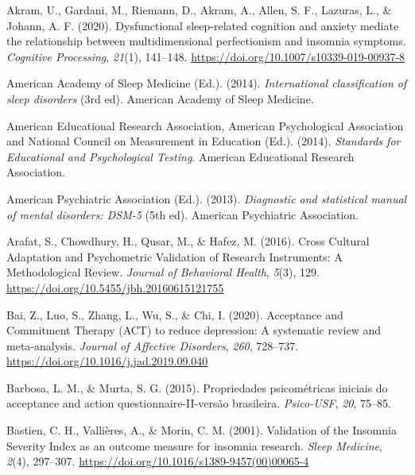 \documentclass[
  ,doc,11pt, twoside,floatsintext]{apa6}
\newlength{\cslhangindent}
\newlength{\cslentryspacingunit} %
\newenvironment{CSLReferences}[2] %
 {%
  \setlength{\parindent}{0pt}
  \ifodd #1
  \let\oldpar\par
  \def\par{\hangindent=\cslhangindent\oldpar}
  \fi
  \setlength{\parskip}{#2\cslentryspacingunit}
 }%
 {}
\begin{document}
\setlength{\parindent}{-0.5in}
\setlength{\leftskip}{0.5in}

\hypertarget{refs}{}
\begin{CSLReferences}{1}{0}
\leavevmode{}%
Akram, U., Gardani, M., Riemann, D., Akram, A., Allen, S. F., Lazuras, L., \& Johann, A. F. (2020). Dysfunctional sleep-related cognition and anxiety mediate the relationship between multidimensional perfectionism and insomnia symptoms. \emph{Cognitive Processing}, \emph{21}(1), 141--148. \url{https://doi.org/10.1007/s10339-019-00937-8}

\leavevmode{}%
American Academy of Sleep Medicine (Ed.). (2014). \emph{International classification of sleep disorders} (3rd ed). {American Academy of Sleep Medicine}.

\leavevmode{}%
American Educational Research Association, American Psychological Association and National Council on Measurement in Education (Ed.). (2014). \emph{Standards for {Educational} and {Psychological Testing}}. {American Educational Research Association}.

\leavevmode{}%
American Psychiatric Association (Ed.). (2013). \emph{Diagnostic and statistical manual of mental disorders: {DSM}-5} (5th ed). {American Psychiatric Association}.

\leavevmode{}%
Arafat, S., Chowdhury, H., Qusar, M., \& Hafez, M. (2016). Cross {Cultural Adaptation} and {Psychometric Validation} of {Research Instruments}: A {Methodological Review}. \emph{Journal of Behavioral Health}, \emph{5}(3), 129. \url{https://doi.org/10.5455/jbh.20160615121755}

\leavevmode{}%
Bai, Z., Luo, S., Zhang, L., Wu, S., \& Chi, I. (2020). Acceptance and {Commitment Therapy} ({ACT}) to reduce depression: {A} systematic review and meta-analysis. \emph{Journal of Affective Disorders}, \emph{260}, 728--737. \url{https://doi.org/10.1016/j.jad.2019.09.040}

\leavevmode{}%
Barbosa, L. M., \& Murta, S. G. (2015). Propriedades psicométricas iniciais do acceptance and action questionnaire-II-versão brasileira. \emph{Psico-USF}, \emph{20}, 75--85.

\leavevmode{}%
Bastien, C. H., Vallières, A., \& Morin, C. M. (2001). Validation of the {Insomnia Severity Index} as an outcome measure for insomnia research. \emph{Sleep Medicine}, \emph{2}(4), 297--307. \url{https://doi.org/10.1016/s1389-9457(00)00065-4}


\end{CSLReferences}
\end{document}
